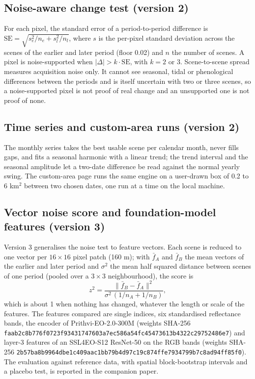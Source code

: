 \documentclass[11pt]{article}
\begin{document}
\subsection{Noise-aware change test (version 2)}

For each pixel, the standard error of a period-to-period difference is $\mathrm{SE} = \sqrt{s_e^2/n_e + s_l^2/n_l}$, where $s$ is the per-pixel standard deviation across the scenes of the earlier and later period (floor 0.02) and $n$ the number of scenes. A pixel is noise-supported when $|\Delta| > k \cdot \mathrm{SE}$, with $k = 2$ or $3$. Scene-to-scene spread measures acquisition noise only. It cannot see seasonal, tidal or phenological differences between the periods and is itself uncertain with two or three scenes, so a noise-supported pixel is not proof of real change and an unsupported one is not proof of none.

\subsection{Time series and custom-area runs (version 2)}

The monthly series takes the best usable scene per calendar month, never fills gaps, and fits a seasonal harmonic with a linear trend; the trend interval and the seasonal amplitude let a two-date difference be read against the normal yearly swing. The custom-area page runs the same engine on a user-drawn box of 0.2 to 6 km$^2$ between two chosen dates, one run at a time on the local machine.

\subsection{Vector noise score and foundation-model features (version 3)}

Version 3 generalises the noise test to feature vectors. Each scene is reduced to one vector per $16 \times 16$ pixel patch (160 m); with $\bar f_A$ and $\bar f_B$ the mean vectors of the earlier and later period and $\sigma^2$ the mean half squared distance between scenes of one period (pooled over a $3 \times 3$ neighbourhood), the score is \[z^2 = \frac{\lVert \bar f_B - \bar f_A \rVert^2}{\sigma^2\,(1/n_A + 1/n_B)},\] which is about 1 when nothing has changed, whatever the length or scale of the features. The features compared are single indices, six standardised reflectance bands, the encoder of Prithvi-EO-2.0-300M \cite{szwarcman2024} (weights SHA-256 \texttt{faab2c8b776f0723f93431747603a7ec586a54fc45473613b4322c29752486e7}) and layer-3 features of an SSL4EO-S12 ResNet-50 \cite{wang2022ssl4eo} on the RGB bands (weights SHA-256 \texttt{2b57ba8b9964dbe1c409aac1bb79b4d97c19c874ffe7934799b7c8ad94ff85f0}). The evaluation against reference data, with spatial block-bootstrap intervals and a placebo test, is reported in the companion paper.
\end{document}
